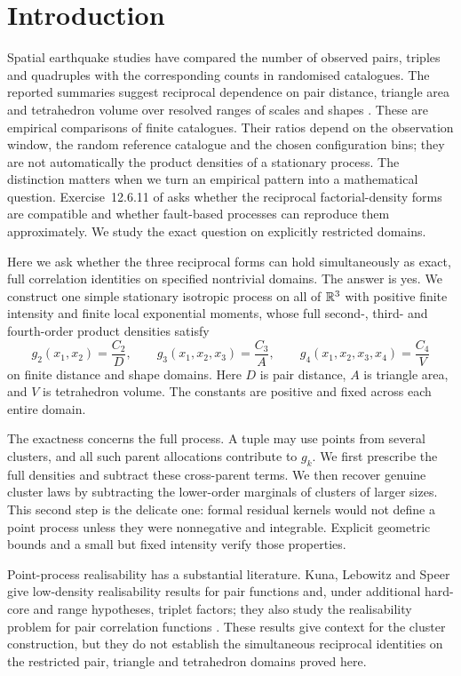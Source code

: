 \section{Introduction}
\label{sec:intro}

Spatial earthquake studies have compared the number of observed pairs, triples and quadruples with the corresponding counts in randomised catalogues. The reported summaries suggest reciprocal dependence on pair distance, triangle area and tetrahedron volume over resolved ranges of scales and shapes \citep{kaganKnopoff1980,kagan1981three,kagan1981four}. These are empirical comparisons of finite catalogues. Their ratios depend on the observation window, the random reference catalogue and the chosen configuration bins; they are not automatically the product densities of a stationary process. The distinction matters when we turn an empirical pattern into a mathematical question. Exercise~12.6.11 of \citet{daleyVereJones2008} asks whether the reciprocal factorial-density forms are compatible and whether fault-based processes can reproduce them approximately. We study the exact question on explicitly restricted domains.

Here we ask whether the three reciprocal forms can hold simultaneously as exact, full correlation identities on specified nontrivial domains. The answer is yes. We construct one simple stationary isotropic process on all of $\mathbb R^3$ with positive finite intensity and finite local exponential moments, whose full second-, third- and fourth-order product densities satisfy
\[
 g_2(x_1,x_2)=\frac{C_2}{D},\qquad
 g_3(x_1,x_2,x_3)=\frac{C_3}{A},\qquad
 g_4(x_1,x_2,x_3,x_4)=\frac{C_4}{V}
\]
on finite distance and shape domains. Here $D$ is pair distance, $A$ is triangle area, and $V$ is tetrahedron volume. The constants are positive and fixed across each entire domain.

The exactness concerns the full process. A tuple may use points from several clusters, and all such parent allocations contribute to $g_k$. We first prescribe the full densities and subtract these cross-parent terms. We then recover genuine cluster laws by subtracting the lower-order marginals of clusters of larger sizes. This second step is the delicate one: formal residual kernels would not define a point process unless they were nonnegative and integrable. Explicit geometric bounds and a small but fixed intensity verify those properties.

Point-process realisability has a substantial literature. Kuna, Lebowitz and Speer give low-density realisability results for pair functions and, under additional hard-core and range hypotheses, triplet factors; they also study the realisability problem for pair correlation functions \citep{kunaLebowitzSpeer2007,kunaLebowitzSpeer2011}. These results give context for the cluster construction, but they do not establish the simultaneous reciprocal identities on the restricted pair, triangle and tetrahedron domains proved here.

